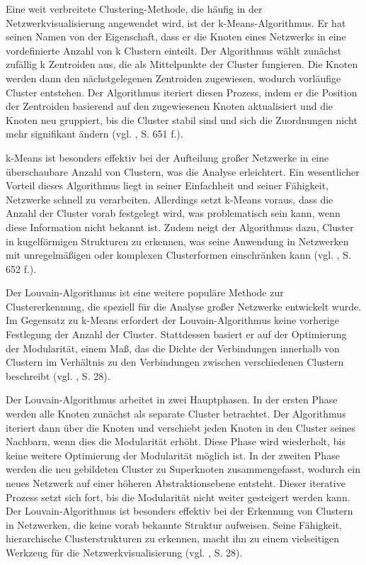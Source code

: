 Eine weit verbreitete Clustering-Methode, die häufig in der Netzwerkvisualisierung angewendet wird, ist der k-Means-Algorithmus. Er hat seinen Namen von der Eigenschaft, dass er die Knoten eines Netzwerks in eine vordefinierte Anzahl von k Clustern einteilt. Der Algorithmus wählt zunächst zufällig k Zentroiden aus, die als Mittelpunkte der Cluster fungieren. Die Knoten werden dann den nächstgelegenen Zentroiden zugewiesen, wodurch vorläufige Cluster entstehen. Der Algorithmus iteriert diesen Prozess, indem er die Position der Zentroiden basierend auf den zugewiesenen Knoten aktualisiert und die Knoten neu gruppiert, bis die Cluster stabil sind und sich die Zuordnungen nicht mehr signifikant ändern (vgl. \cite{kmeans:Xu}, S. 651 f.).

k-Means ist besonders effektiv bei der Aufteilung großer Netzwerke in eine überschaubare Anzahl von Clustern, was die Analyse erleichtert. Ein wesentlicher Vorteil dieses Algorithmus liegt in seiner Einfachheit und seiner Fähigkeit, Netzwerke schnell zu verarbeiten. Allerdings setzt k-Means voraus, dass die Anzahl der Cluster vorab festgelegt wird, was problematisch sein kann, wenn diese Information nicht bekannt ist. Zudem neigt der Algorithmus dazu, Cluster in kugelförmigen Strukturen zu erkennen, was seine Anwendung in Netzwerken mit unregelmäßigen oder komplexen Clusterformen einschränken kann (vgl. \cite{kmeans:Xu}, S. 652 f.).

Der Louvain-Algorithmus ist eine weitere populäre Methode zur Clustererkennung, die speziell für die Analyse großer Netzwerke entwickelt wurde. Im Gegensatz zu k-Means erfordert der Louvain-Algorithmus keine vorherige Festlegung der Anzahl der Cluster. Stattdessen basiert er auf der Optimierung der Modularität, einem Maß, das die Dichte der Verbindungen innerhalb von Clustern im Verhältnis zu den Verbindungen zwischen verschiedenen Clustern beschreibt (vgl. \cite{louvain:Que}, S. 28).

Der Louvain-Algorithmus arbeitet in zwei Hauptphasen. In der ersten Phase werden alle Knoten zunächst als separate Cluster betrachtet. Der Algorithmus iteriert dann über die Knoten und verschiebt jeden Knoten in den Cluster seines Nachbarn, wenn dies die Modularität erhöht. Diese Phase wird wiederholt, bis keine weitere Optimierung der Modularität möglich ist. In der zweiten Phase werden die neu gebildeten Cluster zu Superknoten zusammengefasst, wodurch ein neues Netzwerk auf einer höheren Abstraktionsebene entsteht. Dieser iterative Prozess setzt sich fort, bis die Modularität nicht weiter gesteigert werden kann. Der Louvain-Algorithmus ist besonders effektiv bei der Erkennung von Clustern in Netzwerken, die keine vorab bekannte Struktur aufweisen. Seine Fähigkeit, hierarchische Clusterstrukturen zu erkennen, macht ihn zu einem vielseitigen Werkzeug für die Netzwerkvisualisierung (vgl. \cite{louvain:Que}, S. 28).

